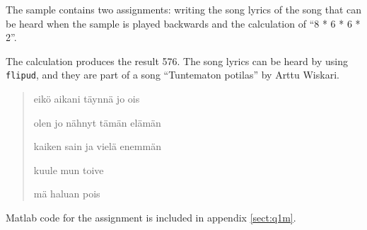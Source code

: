 The sample contains two assignments: writing the song lyrics of the song
that can be heard when the sample is played backwards and the
calculation of ``8 * 6 * 6 * 2''.

The calculation produces the result 576.  The song lyrics can be heard
by using {\tt flipud}, and they are part of a song ``Tuntematon
potilas'' by Arttu Wiskari\cite{wiskari2010}.

\begin{quotation}
eikö aikani täynnä jo ois

olen jo nähnyt tämän elämän

kaiken sain ja vielä enemmän

kuule mun toive

mä haluan pois
\end{quotation}

Matlab code for the assignment is included in appendix \ref{sect:q1m}.
